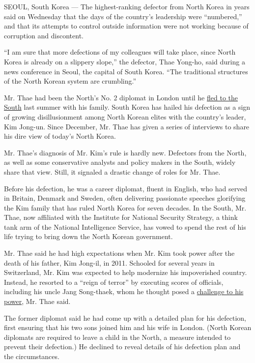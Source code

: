 SEOUL, South Korea --- The highest-ranking defector from North Korea in
years said on Wednesday that the days of the country's leadership were
``numbered,'' and that its attempts to control outside information were
not working because of corruption and discontent.

``I am sure that more defections of my colleagues will take place, since
North Korea is already on a slippery slope,'' the defector, Thae
Yong-ho, said during a news conference in Seoul, the capital of South
Korea. ``The traditional structures of the North Korean system are
crumbling.''

Mr. Thae had been the North's No. 2 diplomat in London until he
\href{https://www.nytimes3xbfgragh.onion/2016/08/18/world/asia/north-korea-defector-thae-yong-ho-britain.html}{fled
to the South} last summer with his family. South Korea has hailed his
defection as a sign of growing disillusionment among North Korean elites
with the country's leader, Kim Jong-un. Since December, Mr. Thae has
given a series of interviews to share his dire view of today's North
Korea.

Mr. Thae's diagnosis of Mr. Kim's rule is hardly new. Defectors from the
North, as well as some conservative analysts and policy makers in the
South, widely share that view. Still, it signaled a drastic change of
roles for Mr. Thae.

Before his defection, he was a career diplomat, fluent in English, who
had served in Britain, Denmark and Sweden, often delivering passionate
speeches glorifying the Kim family that has ruled North Korea for seven
decades. In the South, Mr. Thae, now affiliated with the Institute for
National Security Strategy, a think tank arm of the National
Intelligence Service, has vowed to spend the rest of his life trying to
bring down the North Korean government.

Mr. Thae said he had high expectations when Mr. Kim took power after the
death of his father, Kim Jong-il, in 2011. Schooled for several years in
Switzerland, Mr. Kim was expected to help modernize his impoverished
country. Instead, he resorted to a ``reign of terror'' by executing
scores of officials, including his uncle Jang Song-thaek, whom he
thought posed a
\href{http://www.nytimes3xbfgragh.onion/2013/12/14/world/asia/execution-raises-doubts-about-kims-grip-on-north-korea.html}{challenge
to his power}, Mr. Thae said.

The former diplomat said he had come up with a detailed plan for his
defection, first ensuring that his two sons joined him and his wife in
London. (North Korean diplomats are required to leave a child in the
North, a measure intended to prevent their defection.) He declined to
reveal details of his defection plan and the circumstances.

